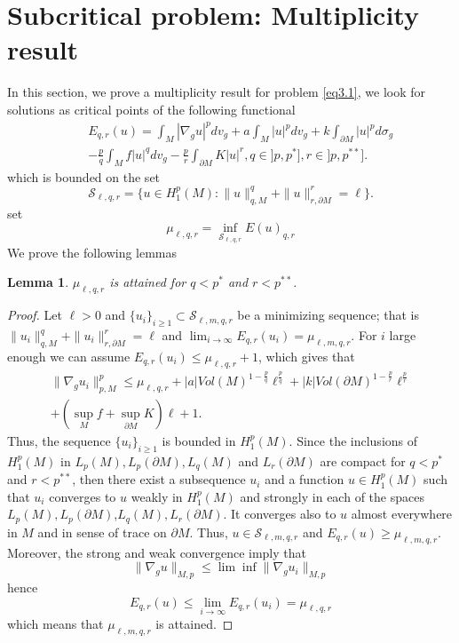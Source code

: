\documentclass{Tran-l}
\newtheorem{lem}[thm]{Lemma}
\theoremstyle{definition}
\theoremstyle{remark}
\numberwithin{equation}{section}
\begin{document}
\section{Subcritical problem: Multiplicity result}
In this section, we prove a multiplicity result for problem
\ref{eq3.1}, we look for solutions as critical points of the
following functional
\begin{eqnarray*}
    &&E_{q,r}(u)=\int_M|\nabla_gu|^pdv_g+a\int_M|u|^pdv_g+k\int_ {\partial
    M}|u|^pd\sigma_g\\&&-\frac{p}{q}\int_Mf|u|^{q}dv_g-\frac{p}{r}\int_{\partial
    M}K|u|^{r},q\in]p,p^*],r\in]p,p^{**}].
\end{eqnarray*}
which is bounded on the set
\begin{equation*}
    {\mathcal{S}}_{\ell,q,r}=\{u\in H^p_1(M):\|u\|_{q,M}^q+\|u\|_{r,\partial
    M}^r=\ell\}.
\end{equation*}
set
\begin{equation*}
    \mu_{\ell,q,r}=\inf_{{\mathcal{S}}_{\ell,q,r}}E(u)_{q,r}
\end{equation*}
We prove the following lemmas
\begin{lem}\label{lem5.1}
$\mu_{\ell,q,r}$ is attained for $q<p^*$ and $r<p^{**}$.
\end{lem}
\begin{proof}
Let $\ell>0$ and $\{u_i\}_{i\geq1}\subset{\mathcal{S}}_{\ell,m,q,r}$ be a
minimizing sequence; that is $\|u_i\|_{q,M}^q+\|u_i\|_{r,\partial
    M}^r=\ell$ and
    $\lim_{i\rightarrow\infty}E_{q,r}(u_i)=\mu_{\ell,m,q,r}$.
For $i$ large enough we can assume
$E_{q,r}(u_i)\leq\mu_{\ell,q,r}+1$, which gives that
\begin{eqnarray*}
&\|\nabla_gu_i\|_{p,M}^p\leq\mu_{\ell,q,r}
+|a|Vol(M)^{1-\frac{p}{q}}\ell^{\frac{p}{q}}+ |k|Vol(\partial
M)^{1-\frac{p}{r}}\ell^{\frac{p}{r}}&\\&+\left(\sup_Mf+\sup_{\partial
M}K\right)\ell+1.&
\end{eqnarray*}
Thus, the sequence $\{u_i\}_{i\geq1}$ is bounded in $H_1^p(M)$.
Since the inclusions of  $H_1^p(M)$ in $L_p(M),L_p(\partial
M),L_q(M)$ and $L_r(\partial M)$ are compact for $q<p^*$ and
$r<p^{**}$, then there exist a subsequence $u_i$ and a function
$u\in H_1^p(M)$ such that $u_i$ converges  to $u$ weakly in
$H_1^p(M)$ and strongly in each of the spaces $L_p(M), L_p(\partial
M)$,$ L_q(M), L_r(\partial M)$. It converges also to $u$ almost
everywhere in $M$ and in sense of trace on $\partial M$. Thus,
$u\in{\mathcal{S}}_{\ell,m,q,r}$ and $E_{q,r}(u)\geq\mu_{\ell,m,q,r}$.
Moreover, the strong and weak convergence imply that
\begin{equation*}
    \|\nabla_gu\|_{M,p}\leq\lim\inf\|\nabla_gu_i\|_{M,p}
\end{equation*}
hence
\begin{equation*}
 E_{q,r}(u)\leq\lim_{i\rightarrow\infty}E_{q,r}(u_i)=\mu_{\ell,q,r}
\end{equation*}
which means that $\mu_{\ell,m,q,r}$ is attained.
\end{proof}
\end{document}
